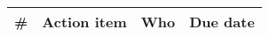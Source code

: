 \begin{longtable}{cXll}
\toprule
\textbf{\#} & \textbf{Action item} & \textbf{Who}  & \textbf{Due date}

\\ \bottomrule
\end{longtable}
